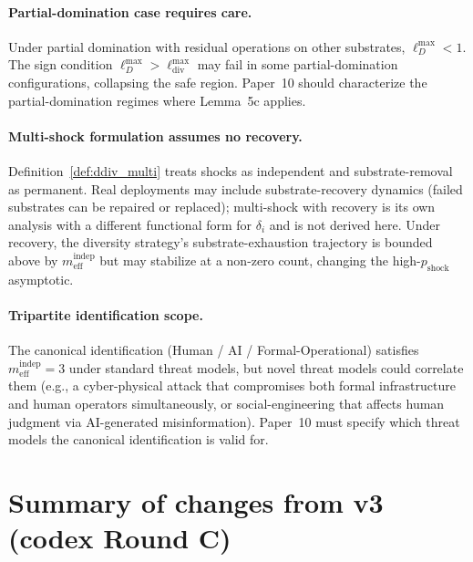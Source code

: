 \documentclass{article}
\newcommand{\mindep}{m_{\mathrm{eff}}^{\mathrm{indep}}}
\newcommand{\pshock}{p_{\mathrm{shock}}}
\newcommand{\lossDmax}{\ell_D^{\max}}
\newcommand{\lossdivmax}{\ell_{\mathrm{div}}^{\max}}
\begin{document}
\paragraph{Partial-domination case requires care.}
Under partial domination with residual operations on other
substrates, $\lossDmax < 1$.  The sign condition $\lossDmax >
\lossdivmax$ may fail in some partial-domination configurations,
collapsing the safe region.  Paper~10 should characterize the
partial-domination regimes where Lemma~5c applies.

\paragraph{Multi-shock formulation assumes no recovery.}
Definition~\ref{def:ddiv_multi} treats shocks as independent and
substrate-removal as permanent.  Real deployments may include
substrate-recovery dynamics (failed substrates can be repaired or
replaced); multi-shock with recovery is its own analysis with a
different functional form for $\delta_i$ and is not derived here.
Under recovery, the diversity strategy's substrate-exhaustion
trajectory is bounded above by $\mindep$ but may stabilize at a
non-zero count, changing the high-$\pshock$ asymptotic.

\paragraph{Tripartite identification scope.}
The canonical identification (Human / AI / Formal-Operational)
satisfies $\mindep = 3$ under standard threat models, but novel
threat models could correlate them (e.g., a cyber-physical attack
that compromises both formal infrastructure and human operators
simultaneously, or social-engineering that affects human judgment via
AI-generated misinformation).  Paper~10 must specify which threat
models the canonical identification is valid for.

\section{Summary of changes from v3 (codex Round C)}
\end{document}
